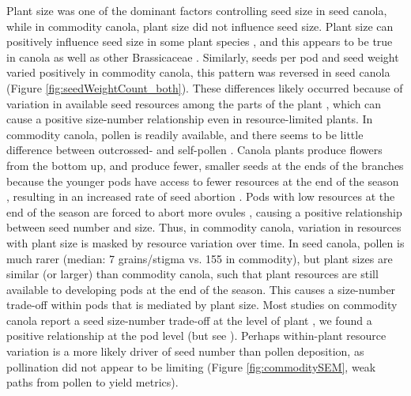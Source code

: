 \documentclass[12pt]{article} %
\begin{document}
Plant size was one of the dominant factors controlling seed size in seed canola, while in commodity canola, plant size did not influence seed size.
Plant size can positively influence seed size in some plant species \citep{maddox1983}, and this appears to be true in canola \citep{riffkin2012} as well as other Brassicaceae \citep{mazer1987}.
Similarly, seeds per pod and seed weight varied positively in commodity canola, this pattern was reversed in seed canola (Figure \ref{fig:seedWeightCount_both}). 
These differences likely occurred because of variation in available seed resources among the parts of the plant \citep{vanNoordwijk1986}, which can cause a positive size-number relationship even in resource-limited plants. 
In commodity canola, pollen is readily available, and there seems to be little difference between outcrossed- and self-pollen \citep{steffan2003, rosa2011}. 
Canola plants produce flowers from the bottom up, and produce fewer, smaller seeds at the ends of the branches because the younger pods have access to fewer resources at the end of the season \citep{sabbahi2006}, resulting in an increased rate of seed abortion \citep{clarke1979}.
Pods with low resources at the end of the season are forced to abort more ovules \citep{wang2011}, causing a positive relationship between seed number and size.
Thus, in commodity canola, variation in resources with plant size is masked by resource variation over time.  
In seed canola, pollen is much rarer (median: 7 grains/stigma vs. 155 in commodity), but plant sizes are similar (or larger) than commodity canola, such that plant resources are still available to developing pods at the end of the season.
This causes a size-number trade-off within pods that is mediated by plant size.
Most studies on commodity canola report a seed size-number trade-off at the level of plant \citep{angadi2003,koltowski2005}, we found a positive relationship at the pod level (but see \citealp{sabbahi2005}).
Perhaps within-plant resource variation is a more likely driver of seed number than pollen deposition, as pollination did not appear to be limiting (Figure \ref{fig:commoditySEM}, weak paths from pollen to yield metrics).
\end{document}
